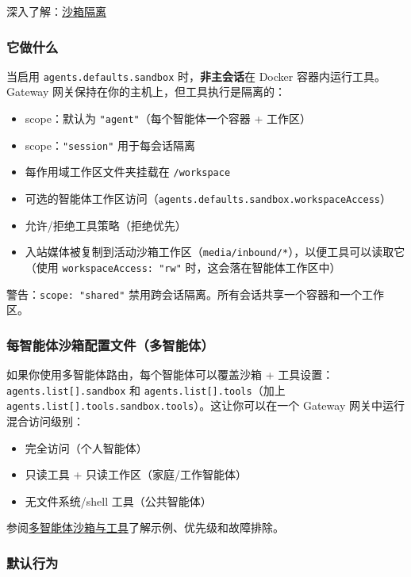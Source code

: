 深入了解：\href{/gateway/sandboxing}{沙箱隔离}

\subsubsection{它做什么}


当启用 \texttt{agents.defaults.sandbox} 时，\textbf{非主会话}在 Docker 容器内运行工具。Gateway 网关保持在你的主机上，但工具执行是隔离的：

\begin{itemize}
  \item scope：默认为 \texttt{"agent"}（每个智能体一个容器 + 工作区）
  \item scope：\texttt{"session"} 用于每会话隔离
  \item 每作用域工作区文件夹挂载在 \texttt{/workspace}
  \item 可选的智能体工作区访问（\texttt{agents.defaults.sandbox.workspaceAccess}）
  \item 允许/拒绝工具策略（拒绝优先）
  \item 入站媒体被复制到活动沙箱工作区（\texttt{media/inbound/*}），以便工具可以读取它（使用 \texttt{workspaceAccess: "rw"} 时，这会落在智能体工作区中）
\end{itemize}


警告：\texttt{scope: "shared"} 禁用跨会话隔离。所有会话共享一个容器和一个工作区。

\subsubsection{每智能体沙箱配置文件（多智能体）}


如果你使用多智能体路由，每个智能体可以覆盖沙箱 + 工具设置：\texttt{agents.list[].sandbox} 和 \texttt{agents.list[].tools}（加上 \texttt{agents.list[].tools.sandbox.tools}）。这让你可以在一个 Gateway 网关中运行混合访问级别：

\begin{itemize}
  \item 完全访问（个人智能体）
  \item 只读工具 + 只读工作区（家庭/工作智能体）
  \item 无文件系统/shell 工具（公共智能体）
\end{itemize}


参阅\href{/tools/multi-agent-sandbox-tools}{多智能体沙箱与工具}了解示例、优先级和故障排除。

\subsubsection{默认行为}


